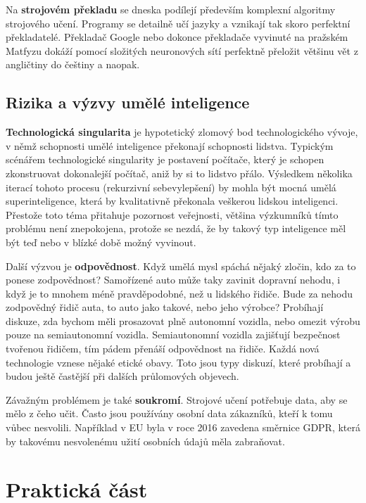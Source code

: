\documentclass[a4paper,11pt, oneside]{book} \usepackage[czech]{babel}
\begin{document}
	Na \textbf{strojovém překladu} se dneska podílejí především komplexní algoritmy strojového učení.
	Programy se detailně učí jazyky a vznikají tak skoro perfektní překladatelé. Překladač Google
	nebo dokonce překladače vyvinuté na pražském Matfyzu dokáží pomocí složitých neuronových sítí
	perfektně přeložit většinu vět z angličtiny do češtiny a naopak.

	\section{Rizika a výzvy umělé inteligence}

	\textbf{Technologická singularita} je hypotetický zlomový bod technologického vývoje,
	v němž schopnosti umělé inteligence překonají schopnosti lidstva.
	Typickým scénářem technologické singularity je postavení počítače,
	který je schopen zkonstruovat dokonalejší počítač, aniž by si to lidstvo přálo.
	Výsledkem několika iterací tohoto procesu (rekurzivní sebevylepšení)
	by mohla být mocná umělá superinteligence,
	která by kvalitativně překonala veškerou lidskou inteligenci.
	Přestože toto téma přitahuje pozornost veřejnosti, většina výzkumníků tímto problému není
	znepokojena, protože se nezdá, že by takový typ inteligence měl být teď nebo v blízké době
	možný vyvinout.

	Další výzvou je \textbf{odpovědnost}.
	Když umělá mysl spáchá nějaký zločin, kdo za to ponese zodpovědnost? Samořízené auto
	může taky zavinit dopravní nehodu, i když je to mnohem méně pravděpodobné, než u lidského řidiče.
	Bude za nehodu zodpovědný řidič auta, to auto jako takové, nebo jeho výrobce?
	Probíhají diskuze, zda bychom měli
	prosazovat plně autonomní vozidla, nebo omezit výrobu pouze na semiautonomní vozidla.
	Semiautonomní vozidla zajišťují bezpečnost tvořenou řidičem, tím pádem přenáší odpovědnost na řidiče.
	Každá nová technologie vznese nějaké etické obavy. Toto jsou typy diskuzí, které probíhají
	a budou ještě častější při dalších průlomových objevech.

	Závažným problémem je také \textbf{soukromí}. Strojové učení potřebuje data, aby se mělo z čeho učit.
	Často jsou používány osobní data zákazníků, kteří k tomu vůbec nesvolili. Například v EU byla v roce
	2016 zavedena směrnice GDPR, která by takovému nesvolenému užití osobních údajů měla zabraňovat.




	\chapter{Praktická část}
\end{document}
